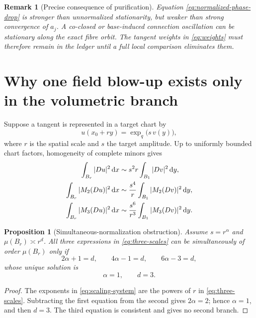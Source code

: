 \documentclass[10pt]{article}
\newtheorem{proposition}[theorem]{Proposition}
\newtheorem{remark}[theorem]{Remark}
\newcommand{\dd}{\,\mathrm d}
\begin{document}
\begin{remark}[Precise consequence of purification]
Equation \eqref{eq:normalized-phase-drop} is stronger than unnormalized
stationarity, but weaker than strong convergence of $a_j$.  A co-closed or
base-induced connection oscillation can be stationary along the exact fibre
orbit.  The tangent weights in \eqref{eq:weights} must therefore remain in
the ledger until a full local comparison eliminates them.
\end{remark}

\section{Why one field blow-up exists only in the volumetric branch}

Suppose a tangent is represented in a target chart by
\begin{equation}
 u(x_0+ry)=\exp_q\bigl(s\,v(y)\bigr),
 \label{eq:chart-blowup}
\end{equation}
where $r$ is the spatial scale and $s$ the target amplitude.  Up to uniformly
bounded chart factors, homogeneity of complete minors gives
\begin{align}
 \int_{B_r}|Du|^2\dd x
 &\sim s^2r\int_{B_1}|Dv|^2\dd y,\notag\\
 \int_{B_r}|M_2(Du)|^2\dd x
 &\sim \frac{s^4}{r}\int_{B_1}|M_2(Dv)|^2\dd y,\notag\\
 \int_{B_r}|M_3(Du)|^2\dd x
 &\sim \frac{s^6}{r^3}\int_{B_1}|M_3(Dv)|^2\dd y.
 \label{eq:three-scales}
\end{align}

\begin{proposition}[Simultaneous-normalization obstruction]
Assume $s=r^\alpha$ and $\mu(B_r)\asymp r^d$.  All three expressions in
\eqref{eq:three-scales} can be simultaneously of order $\mu(B_r)$ only if
\begin{equation}
 2\alpha+1=d,\qquad4\alpha-1=d,\qquad6\alpha-3=d,
 \label{eq:scaling-system}
\end{equation}
whose unique solution is
\begin{equation}
 \boxed{\alpha=1,\qquad d=3.}
 \label{eq:volumetric}
\end{equation}
\end{proposition}

\begin{proof}
The exponents in \eqref{eq:scaling-system} are the powers of $r$ in
\eqref{eq:three-scales}.  Subtracting the first equation from the second
gives $2\alpha=2$; hence $\alpha=1$, and then $d=3$.  The third equation is
consistent and gives no second branch.
\end{proof}
\end{document}

